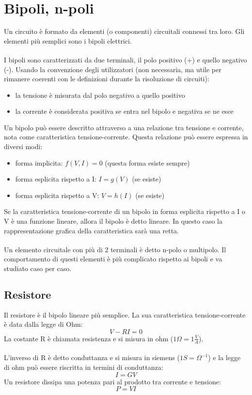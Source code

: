 \documentclass{article}
\begin{document}
\newpage
\section{Bipoli, n-poli}
Un circuito è formato da elementi (o componenti) circuitali connessi tra loro. Gli elementi più semplici sono i bipoli elettrici.\\\\
I bipoli sono caratterizzati da due terminali, il polo positivo (+) e quello negativo (-). Usando la convenzione degli utilizzatori (non necessaria, ma utile per rimanere coerenti con le definizioni durante la risoluzione di circuiti):
\begin{itemize}
    \item la tensione è misurata dal polo negativo a quello positivo
    \item la corrente è considerata positiva se entra nel bipolo e negativa se ne esce
\end{itemize}
Un bipolo può essere descritto attraverso a una relazione tra tensione e corrente, nota come caratteristica tensione-corrente. Questa relazione può essere espressa in diversi modi:
\begin{itemize}
    \item forma implicita: $f(V,I)=0$ (questa forma esiste sempre)
    \item forma esplicita rispetto a I: $I=g(V)$ (se esiste)
    \item forma esplicita rispetto a V: $V=h(I)$ (se esiste)
\end{itemize}
Se la caratteristica tensione-corrente di un bipolo in forma esplicita rispetto a I o V è una funzione lineare, allora il bipolo è detto lineare. In questo caso la rappresentazione grafica della caratteristica sarà una retta.\\\\
Un elemento circuitale con più di 2 terminali è detto n-polo o multipolo. Il comportamento di questi elementi è più complicato rispetto ai bipoli e va studiato caso per caso.

\subsection{Resistore}
Il resistore è il bipolo lineare più semplice. La sua caratteristica tensione-corrente è data dalla legge di Ohm:
$$ V-RI=0 $$
La costante R è chiamata resistenza e si misura in ohm ($1\Omega=1\frac{V}{A}$).\\\\
L'inverso di R è detto conduttanza e si misura in siemens ($1S=\Omega^{-1}$) e la legge di ohm può essere riscritta in termini di conduttanza:
$$ I=GV $$
Un resistore dissipa una potenza pari al prodotto tra corrente e tensione:
$$ P=VI $$
\end{document}

